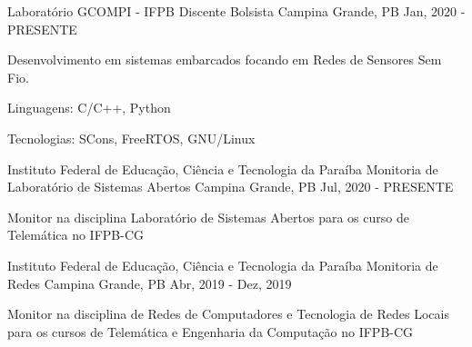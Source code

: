 
\begin{cventries}
  \cventry
  {Laboratório GCOMPI - IFPB} %
  {Discente Bolsista} %
  {Campina Grande, PB} %
  {Jan, 2020 - PRESENTE} %
  {
    \begin{cvitems} %
      \item {Desenvolvimento em sistemas embarcados focando em Redes de Sensores Sem Fio.}
      \item {Linguagens: C/C++, Python}
      \item {Tecnologias: SCons, FreeRTOS, GNU/Linux}
    \end{cvitems}
  }

  \cventry
  {Instituto Federal de Educação, Ciência e Tecnologia da Paraíba}
  {Monitoria de Laboratório de Sistemas Abertos}
  {Campina Grande, PB}
  {Jul, 2020 - PRESENTE}
  {
    \begin{cvitems}
      \item {Monitor na disciplina Laboratório de Sistemas Abertos para os curso de Telemática no IFPB-CG}
    \end{cvitems}
  }

  \cventry
  {Instituto Federal de Educação, Ciência e Tecnologia da Paraíba}
  {Monitoria de Redes}
  {Campina Grande, PB}
  {Abr, 2019 - Dez, 2019}
  {
    \begin{cvitems}
      \item {Monitor na disciplina de Redes de Computadores e Tecnologia de Redes Locais para os cursos de Telemática e Engenharia da Computação no IFPB-CG}
    \end{cvitems}
  }

\end{cventries}

